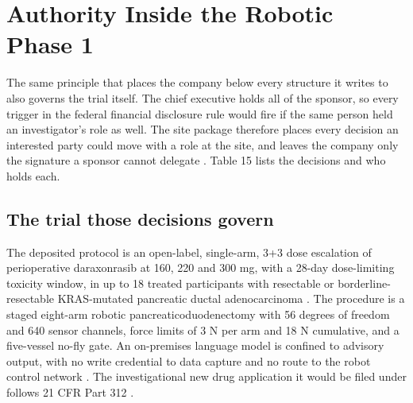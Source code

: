 \section{Authority Inside the Robotic Phase 1}

The same principle that places the company below every structure it writes to
also governs the trial itself. The chief executive holds all of the sponsor, so
every trigger in the federal financial disclosure rule would fire if the same
person held an investigator's role as well. The site package therefore places every decision an
interested party could move with a role at the site, and leaves the company only
the signature a sponsor cannot delegate \cite{movein2026}. Table 15 lists the
decisions and who holds each.

\subsection{The trial those decisions govern}

The deposited protocol is an open-label, single-arm, 3+3 dose escalation of
perioperative daraxonrasib at 160, 220 and 300 mg, with a 28-day dose-limiting
toxicity window, in up to 18 treated participants with resectable or
borderline-resectable KRAS-mutated pancreatic ductal adenocarcinoma
\cite{onpremwhippl}. The procedure is a staged eight-arm robotic
pancreaticoduodenectomy with 56 degrees of freedom and 640 sensor channels, force
limits of 3 N per arm and 18 N cumulative, and a five-vessel no-fly gate. An
on-premises language model is confined to advisory output, with no write
credential to data capture and no route to the robot control network
\cite{phase1ind}. The investigational new drug application it would be filed
under follows 21 CFR Part 312 \cite{ecfr2026part312}.

